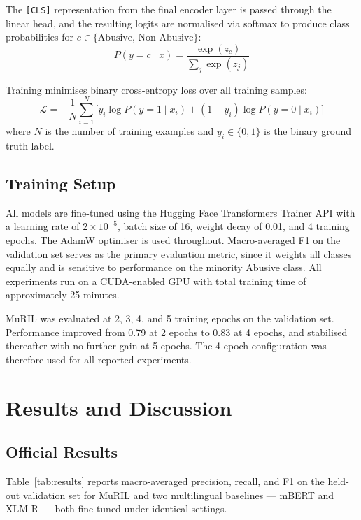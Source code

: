 \documentclass[11pt]{article}
\begin{document}
The \texttt{[CLS]} representation from the final encoder layer is passed through the linear head,
and the resulting logits are normalised via softmax to produce class probabilities for $c \in
\{\text{Abusive},\, \text{Non-Abusive}\}$:
\begin{equation}
P(y = c \mid x) = \frac{\exp(z_c)}{\sum_{j} \exp(z_j)}
\end{equation}

Training minimises binary cross-entropy loss
over all training samples:
\begin{equation}
\mathcal{L} = -\frac{1}{N}\sum_{i=1}^{N}\!\Big[y_i \log P(y{=}1 \mid x_i) + (1{-}y_i)\log P(y{=}0 \mid x_i)\Big]
\end{equation}
where $N$ is the number of training examples and
$y_i \in \{0,1\}$ is the binary ground truth label.

\subsection{Training Setup}

All models are fine-tuned using the Hugging Face
Transformers Trainer API \cite{wolf2020} with a learning rate
of $2\times10^{-5}$, batch size of 16, weight decay of 0.01,
and 4 training epochs. The AdamW optimiser is
used throughout. Macro-averaged F1 on the validation set serves as the primary evaluation metric,
since it weights all classes equally and is sensitive
to performance on the minority Abusive class. All
experiments run on a CUDA-enabled GPU with
total training time of approximately 25 minutes.

MuRIL was evaluated at 2, 3, 4, and 5 training epochs on the validation set. Performance improved from 0.79 at 2 epochs to 0.83 at 4 epochs,
and stabilised thereafter with no further gain at 5
epochs. The 4-epoch configuration was therefore
used for all reported experiments.

\section{Results and Discussion}

\subsection{Official Results}

Table~\ref{tab:results} reports macro-averaged precision, recall,
and F1 on the held-out validation set for MuRIL
and two multilingual baselines --- mBERT \cite{devlin2019} and
XLM-R \cite{conneau2020} --- both fine-tuned under identical settings.
\end{document}
